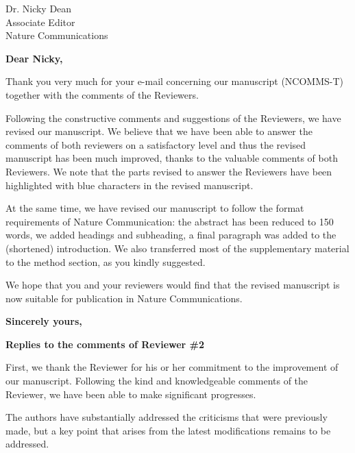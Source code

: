 \documentclass[a4paper, rebuttal, parskip=true, firsthead=false, fromemail=true, foldmarks=false]{scrlttr2}
\begin{document}
 
\begin{letter}{Dr. Nicky Dean\\
Associate Editor\\
Nature Communications}
\opening{\bf Dear Nicky,}

Thank you very much for your e-mail concerning our manuscript (NCOMMS\nobreakdash-T) together with the comments of the Reviewers. 

Following the constructive comments and suggestions of the Reviewers, we have revised our manuscript. 
We believe that we have been able to answer the comments of both reviewers on a satisfactory level and thus the revised manuscript has been much improved, thanks to the valuable comments of both Reviewers. We note that the parts revised to answer the Reviewers have been highlighted with blue characters in the revised manuscript.

At the same time, we have revised our manuscript to follow the format requirements of Nature Communication: the abstract has been reduced to 150 words, we added headings and subheading, a final paragraph was added to the (shortened) introduction. We also transferred most of the supplementary material to the method section, as you kindly suggested.


We hope that you and your reviewers would find that the revised manuscript is now suitable for publication in Nature Communications. 

\closing{\bf Sincerely yours,} 
\clearpage

\textsf{\textbf{Replies to the comments of Reviewer \#2}}

First, we thank the Reviewer for his or her commitment to the improvement of our manuscript. Following the kind and knowledgeable comments of the Reviewer, we have been able to make significant progresses.

\begin{quotationi}
The authors have substantially addressed the criticisms that were previously made, but a key point that arises from the latest modifications remains to be addressed.


\end{quotationi}
\end{letter}
\end{document}
